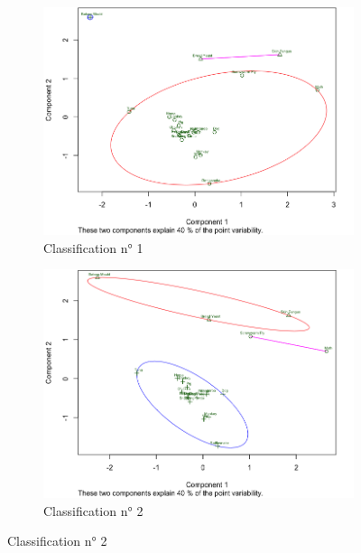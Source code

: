 \documentclass[a4paper,10pt]{report}
\begin{document}
\begin{figure}[H]
	\centering
	\captionsetup{justification=centering, margin=2cm}
	\begin{subfigure}[b]{0.5\linewidth}
		\centering
		\captionsetup{justification=centering}
		\includegraphics[width=1\linewidth]{img/3-3-mut-K-means-class-1}
		\caption{\small Classification n° 1}
		\label{fig:3-3-mut-K-means-class-1}
	\end{subfigure}%
	\begin{subfigure}[b]{0.5\linewidth}
		\centering
		\captionsetup{justification=centering}
		\includegraphics[width=1\linewidth]{img/3-3-mut-K-means-class-2}
		\caption{\small Classification n° 2}
		\label{fig:3-3-mut-K-means-class-2}
	\end{subfigure}%

\end{figure}
\end{document}
